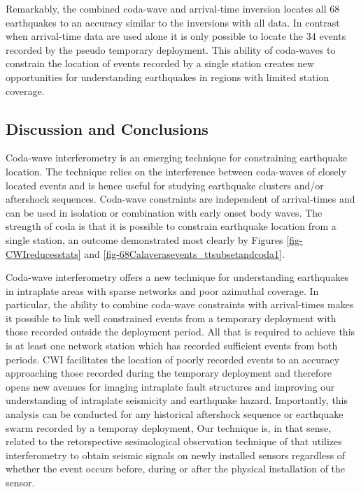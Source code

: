 \documentclass[12pt,double]{article}
\begin{document}
Remarkably, the combined coda-wave and arrival-time inversion locates
all 68 earthquakes to an accuracy similar to the inversions with all
data. In contrast when arrival-time data are used alone it is only
possible to locate the 34 events recorded by the pseudo temporary
deployment. This
ability of  coda-waves to constrain the location of events recorded
by a single station creates new opportunities for understanding
earthquakes in regions with limited station coverage.

\vspace{2em}
\begin{centering}
\section*{Discussion and Conclusions}
\end{centering}

Coda-wave interferometry is an emerging technique for constraining
earthquake location. The technique relies on the interference
between coda-waves of closely located events and is hence useful for
studying earthquake clusters and/or aftershock sequences. Coda-wave
constraints are independent of arrival-times and can be used in
isolation or combination with early onset body waves. The strength
of coda is that it is possible to constrain earthquake location from
a single station, an outcome demonstrated most clearly by Figures
\ref{fig-CWIreducesstats} and
\ref{fig-68Calaverasevents_ttsubsetandcoda1}.

Coda-wave interferometry offers a new technique for understanding
earthquakes in intraplate areas with sparse networks and poor
azimuthal coverage. In particular, the ability to combine coda-wave
constraints with arrival-times makes it possible to link well
constrained events from a temporary deployment with those recorded
outside the deployment period. All that is required to achieve this
is at least one network station which has recorded sufficient events
from both periods. CWI facilitates the location of poorly recorded
events to an accuracy approaching those recorded during the
temporary deployment and therefore opens new avenues for imaging
intraplate fault structures and improving our understanding of
intraplate seismicity and earthquake hazard. Importantly, this analysis 
can be conducted for any historical aftershock sequence or earthquake swarm
recorded by a temporay deployment, Our technique is, in that sense, related
to the retorspective sesimological observation technique of 
\citet{dr_Curtis12a_EPSL} that utilizes interferometry to obtain seismic signals
on newly installed sensors regardless of whether the event occurs before, 
during or after the physical installation of the sensor. 
\end{document}
